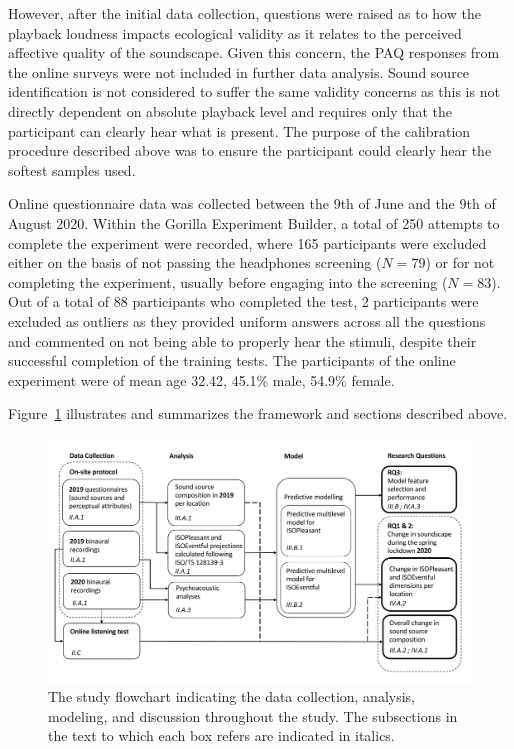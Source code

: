 \documentclass[
  authoryear,
  preprint,
  3p,
  onecolumn]{elsarticle}
\begin{document}
However, after the initial data collection, questions were raised as to
how the playback loudness impacts ecological validity as it relates to
the perceived affective quality of the soundscape. Given this concern,
the PAQ responses from the online surveys were not included in further
data analysis. Sound source identification is not considered to suffer
the same validity concerns as this is not directly dependent on absolute
playback level and requires only that the participant can clearly hear
what is present. The purpose of the calibration procedure described
above was to ensure the participant could clearly hear the softest
samples used.

Online questionnaire data was collected between the 9th of June and the
9th of August 2020. Within the Gorilla Experiment Builder, a total of
250 attempts to complete the experiment were recorded, where 165
participants were excluded either on the basis of not passing the
headphones screening (\(N=79\)) or for not completing the experiment,
usually before engaging into the screening (\(N=83\)). Out of a total of
88 participants who completed the test, 2 participants were excluded as
outliers as they provided uniform answers across all the questions and
commented on not being able to properly hear the stimuli, despite their
successful completion of the training tests. The participants of the
online experiment were of mean age 32.42, 45.1\% male, 54.9\% female.

Figure~\ref{fig-framework} illustrates and summarizes the framework and
sections described above.

\begin{figure}

{\centering \includegraphics[width=1\textwidth,height=\textheight]{Figure1.png}

}

\caption{\label{fig-framework}The study flowchart indicating the data
collection, analysis, modeling, and discussion throughout the study. The
subsections in the text to which each box refers are indicated in
italics.}

\end{figure}
\end{document}
